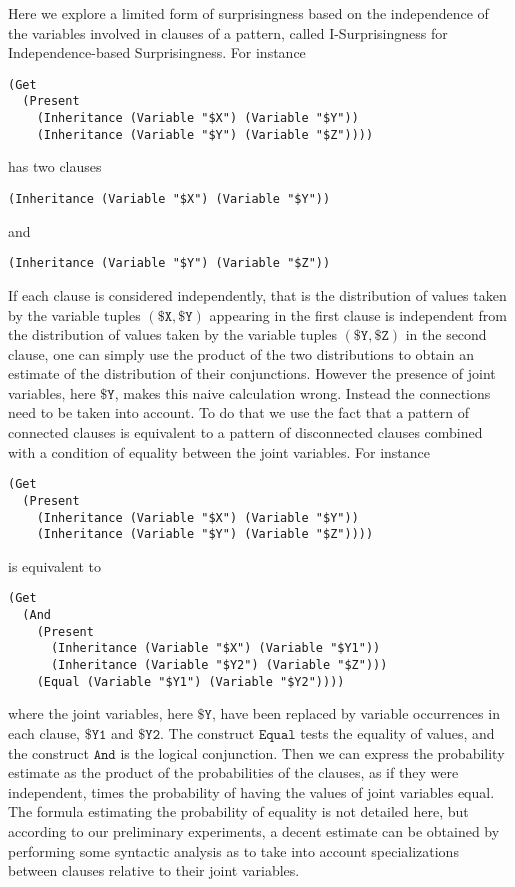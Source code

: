 \documentclass[runningheads]{llncs}
\begin{document}
Here we explore a limited form of surprisingness based on the
independence of the variables involved in clauses of a pattern, called
I-Surprisingness for Independence-based Surprisingness. For instance
\begin{verbatim}
(Get
  (Present
    (Inheritance (Variable "$X") (Variable "$Y"))
    (Inheritance (Variable "$Y") (Variable "$Z"))))
\end{verbatim}
has two clauses
\begin{verbatim}
(Inheritance (Variable "$X") (Variable "$Y"))
\end{verbatim}
and
\begin{verbatim}
(Inheritance (Variable "$Y") (Variable "$Z"))
\end{verbatim}
If each clause is considered independently, that is the distribution
of values taken by the variable tuples $(\texttt{\$X}, \texttt{\$Y})$
appearing in the first clause is independent from the distribution of
values taken by the variable tuples $(\texttt{\$Y}, \texttt{\$Z})$ in
the second clause, one can simply use the product of the two
distributions to obtain an estimate of the distribution of their
conjunctions. However the presence of joint variables, here
$\texttt{\$Y}$, makes this naive calculation wrong. Instead the
connections need to be taken into account. To do that we use the fact
that a pattern of connected clauses is equivalent to a pattern of
disconnected clauses combined with a condition of equality between the
joint variables. For instance
\begin{verbatim}
(Get
  (Present
    (Inheritance (Variable "$X") (Variable "$Y"))
    (Inheritance (Variable "$Y") (Variable "$Z"))))
\end{verbatim}
is equivalent to
\begin{verbatim}
(Get
  (And
    (Present
      (Inheritance (Variable "$X") (Variable "$Y1"))
      (Inheritance (Variable "$Y2") (Variable "$Z")))
    (Equal (Variable "$Y1") (Variable "$Y2"))))
\end{verbatim}
where the joint variables, here $\texttt{\$Y}$, have been replaced by
variable occurrences in each clause, $\texttt{\$Y1}$ and
$\texttt{\$Y2}$. The construct $\texttt{Equal}$ tests the equality of
values, and the construct $\texttt{And}$ is the logical
conjunction.
Then we can express the probability estimate as the product of the
probabilities of the clauses, as if they were independent, times the
probability of having the values of joint variables equal. The formula
estimating the probability of equality is not detailed here, but
according to our preliminary experiments, a decent estimate can be
obtained by performing some syntactic analysis as to take into account
specializations between clauses relative to their joint variables.
\end{document}
